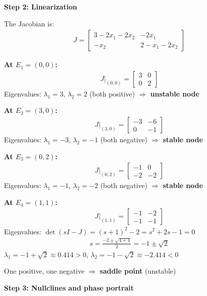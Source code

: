 \documentclass[11pt,a4paper]{article}
\begin{document}
\textbf{Step 2: Linearization}

The Jacobian is:
\begin{align}
  J = \begin{bmatrix} 3 - 2x_1 - 2x_2 & -2x_1 \\ -x_2 & 2 - x_1 - 2x_2 \end{bmatrix}
\end{align}

\textbf{At $E_1 = (0,0)$:}
\begin{align}
  J|_{(0,0)} = \begin{bmatrix} 3 & 0 \\ 0 & 2 \end{bmatrix}
\end{align}
Eigenvalues: $\lambda_1 = 3$, $\lambda_2 = 2$ (both positive) $\Rightarrow$ \textbf{unstable node}

\textbf{At $E_2 = (3,0)$:}
\begin{align}
  J|_{(3,0)} = \begin{bmatrix} -3 & -6 \\ 0 & -1 \end{bmatrix}
\end{align}
Eigenvalues: $\lambda_1 = -3$, $\lambda_2 = -1$ (both negative) $\Rightarrow$ \textbf{stable node}

\textbf{At $E_3 = (0,2)$:}
\begin{align}
  J|_{(0,2)} = \begin{bmatrix} -1 & 0 \\ -2 & -2 \end{bmatrix}
\end{align}
Eigenvalues: $\lambda_1 = -1$, $\lambda_2 = -2$ (both negative) $\Rightarrow$ \textbf{stable node}

\textbf{At $E_4 = (1,1)$:}
\begin{align}
  J|_{(1,1)} = \begin{bmatrix} -1 & -2 \\ -1 & -1 \end{bmatrix}
\end{align}
Eigenvalues: $\det(sI - J) = (s+1)^2 - 2 = s^2 + 2s - 1 = 0$
\begin{align}
  s = \frac{-2 \pm \sqrt{4+4}}{2} = -1 \pm \sqrt{2}
\end{align}
$\lambda_1 = -1 + \sqrt{2} \approx 0.414 > 0$, $\lambda_2 = -1 - \sqrt{2} \approx -2.414 < 0$

One positive, one negative $\Rightarrow$ \textbf{saddle point} (unstable)

\textbf{Step 3: Nullclines and phase portrait}
\end{document}
